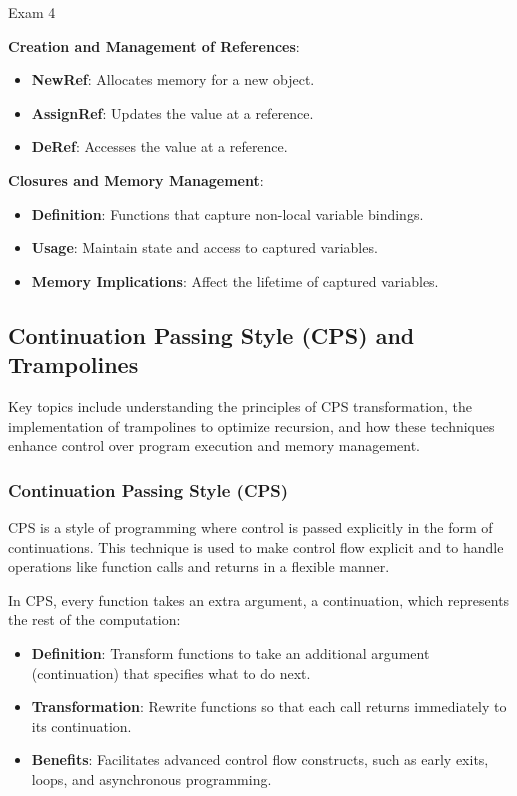 \begin{examnotes}{Exam 4}
\begin{highlight}
        \textbf{Creation and Management of References}:
        \begin{itemize}
            \item \textbf{NewRef}: Allocates memory for a new object.
            \item \textbf{AssignRef}: Updates the value at a reference.
            \item \textbf{DeRef}: Accesses the value at a reference.
        \end{itemize}
        
        \textbf{Closures and Memory Management}:
        \begin{itemize}
            \item \textbf{Definition}: Functions that capture non-local variable bindings.
            \item \textbf{Usage}: Maintain state and access to captured variables.
            \item \textbf{Memory Implications}: Affect the lifetime of captured variables.
        \end{itemize}
    \end{highlight}

    \subsection*{Continuation Passing Style (CPS) and Trampolines}

    Key topics include understanding the principles of CPS transformation, the implementation of trampolines to optimize recursion, and how these techniques enhance control over program execution and 
    memory management.
    
    \subsubsection*{Continuation Passing Style (CPS)}
    
    CPS is a style of programming where control is passed explicitly in the form of continuations. This technique is used to make control flow explicit and to handle operations like function calls and 
    returns in a flexible manner.
    
    \begin{highlight}
        In CPS, every function takes an extra argument, a continuation, which represents the rest of the computation:
        \begin{itemize}
            \item \textbf{Definition}: Transform functions to take an additional argument (continuation) that specifies what to do next.
            \item \textbf{Transformation}: Rewrite functions so that each call returns immediately to its continuation.
            \item \textbf{Benefits}: Facilitates advanced control flow constructs, such as early exits, loops, and asynchronous programming.
        \end{itemize}
    \end{highlight}
    

\end{examnotes}
